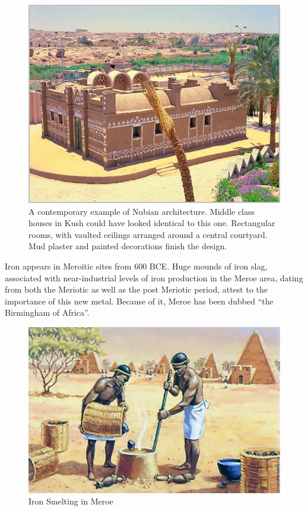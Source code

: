 \documentclass[a4paper,12pt]{scrreprt}
\begin{document}
\begin{figure}[H]
	\centering
	\includegraphics[width=\textwidth]{img/house/contemporary_nubian_architecture}
	\caption{A contemporary example of Nubian architecture. Middle class houses in Kush could have looked identical to this one. Rectangular rooms, with vaulted ceilings arranged around a central courtyard. Mud plaster and painted decorations finish the design.}
\end{figure}

Iron appears in Meroitic sites from 600 BCE. Huge mounds of iron slag, associated with near-industrial levels of iron production in the Meroe area, dating from both the Meriotic as well as the post Meriotic period, attest to the importance of this new metal. Because of it, Meroe has been dubbed “the Birmingham of Africa”.

\begin{figure}[H]
	\centering
	\includegraphics[width=\textwidth]{img/iron_smelting}
	\caption{Iron Smelting in Meroe}
\end{figure}
\end{document}

